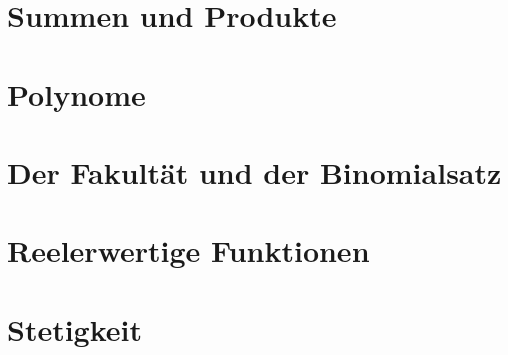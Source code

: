\documentclass[12pt, twoside, openright]{report}
\theoremstyle{definition} %
\theoremstyle{definition} %
\theoremstyle{definition} %
\theoremstyle{definition} %
\theoremstyle{definition} %
\theoremstyle{remark} %
\begin{document}
		\section{Summen und Produkte}
		
		
		\section{Polynome}
		
		
		\section{Der Fakultät und der Binomialsatz}
		
		
		\section{Reelerwertige Funktionen}
		
		
		\section{Stetigkeit}
		
	
\end{document}
